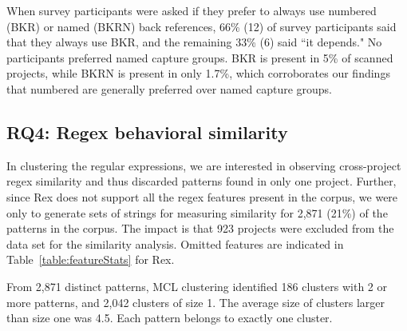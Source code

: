 When survey participants were asked if they prefer to always use numbered (BKR) or named (BKRN) back references, 66\% (12) of survey participants said that they always use BKR, and the remaining 33\% (6) said ``it depends."  No participants preferred named capture groups.  BKR is present in 5\% of scanned projects, while BKRN is present in only 1.7\%, which corroborates our findings that numbered  are generally preferred over named capture groups.

\subsection{RQ4: Regex behavioral similarity}
\label{rq4:results}


In clustering the regular expressions, we are interested in observing cross-project regex similarity and thus discarded patterns found in only one project.
Further, since Rex does not support all the regex features present in the corpus, we were only to generate sets of strings for measuring similarity for 2,871 (21\%) of the  patterns in the corpus. The impact is that 923 projects were excluded from the data set for the similarity analysis. Omitted features are indicated in Table~\ref{table:featureStats} for Rex.




From 2,871 distinct patterns, MCL clustering identified 186 clusters with 2 or more patterns, and 2,042 clusters of size 1.
 The average size of clusters larger than size one was 4.5.  Each pattern belongs to exactly one cluster.

